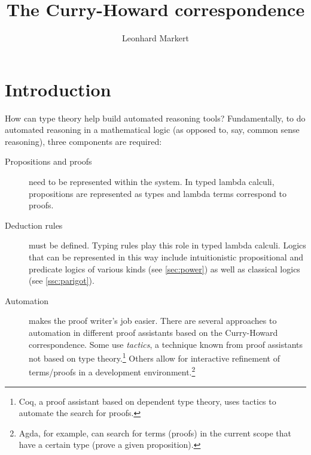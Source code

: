 \documentclass[12pt,toc=bibliography,numbers=noendperiod,
               footnotes=multiple,twoside]{scrartcl}
\title{The Curry-Howard correspondence}
\author{Leonhard Markert}
\date{}
\begin{document}
\thispagestyle{empty}
\maketitle


\vspace{10pt}
\makeatletter
{}
\makeatother
\newpage

\section{Introduction}

How can type theory help build automated reasoning tools? Fundamentally, to do automated reasoning in a mathematical logic (as opposed to, say, common sense reasoning), three components are required:

\begin{description}
\item[Propositions and proofs] need to be represented within the system. In typed lambda calculi, propositions are represented as types and lambda terms correspond to proofs.
\item[Deduction rules] must be defined. Typing rules play this role in typed lambda calculi. Logics that can be represented in this way include intuitionistic propositional and predicate logics of various kinds (see \cref{sec:power}) as well as classical logics (see \cref{ssc:parigot}).
\item[Automation] makes the proof writer's job easier. There are several approaches to automation in different proof assistants based on the Curry-Howard correspondence. Some use \emph{tactics}, a technique known from proof assistants not based on type theory.\footnote{Coq, a proof assistant based on dependent type theory, uses tactics to automate the search for proofs.} Others allow for interactive refinement of terms/proofs in a development environment.\footnote{Agda, for example, can search for terms (proofs) in the current scope that have a certain type (prove a given proposition).}
\end{description}
\end{document}
